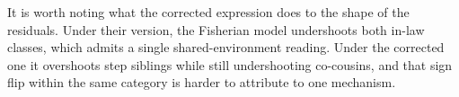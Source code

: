 \documentclass[12pt]{article}
\begin{document}
It is worth noting what the corrected expression does to the shape of the residuals.
Under their version, the Fisherian model undershoots both in-law classes, which admits a single shared-environment reading.
Under the corrected one it overshoots step siblings while still undershooting co-cousins, and that sign flip within the same category is harder to attribute to one mechanism.



\end{document}
